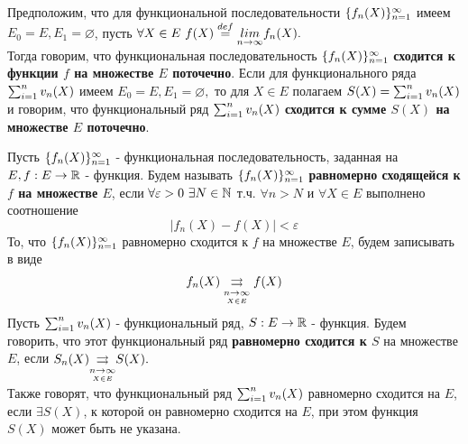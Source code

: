 \documentclass[main]{subfiles}
\begin{document}
   \begin{definition}
Предположим, что для функциональной последовательности $\fnn[f_n(X)]$ имеем $E_0=E, E_1=\varnothing$, 
пусть $\forall X\in E\ f(X)\stackrel{def}{=}\Lim f_n(X).$\\ 
Тогда говорим, что функциональная последовательность 
$\fnn[f_n(X)]$ \textbf{сходится к функции $f$ на множестве $E$ поточечно}.
 Если для функционального ряда $\sumn v_n(X)$ имеем $E_0=E, E_1=\varnothing,$ 
 то для $X\in E$ полагаем $S(X)=\sumn v_n(X)$ и говорим, что функциональный ряд
  $\sumn v_n(X)$ \textbf{сходится к сумме $S(X)$ на множестве $E$ поточечно}. \end{definition}
\begin{definition}
Пусть $\fnn[f_n(X)]$ - функциональная последовательность, заданная на $E, f:E\to{\vR}$ - функция. 
Будем называть $\fnn[f_n(X)]$ \textbf{равномерно сходящейся к $f$ на множестве $E$}, 
если $\forall \varepsilon>0 \ \exists N\in\N $ т.ч. $\forall n>N$ и $\forall X\in E$ 
выполнено соотношение \[ |f_n(X)-f(X)|<\varepsilon\tag{1} \]
То, что $\fnn[f_n(X)]$ равномерно сходится к $f$ на множестве $E$, будем записывать в виде 
\[ f_n(X) \darrow{\underset{X\in E}{n\to\infty}}  f(X)  \]
Пусть $\sumn v_n(X)$ - функциональный ряд, $S:E\to{\vR}$ - функция. Будем говорить, 
что этот функциональный ряд \textbf{равномерно сходится к $S$} на множестве $E$,
 если $S_n(X){\darrow{\underset{X\in E}{n\to\infty}}} S(X).$\\
Также говорят, что функциональный ряд $\sumn v_n(X)$ равномерно сходится на $E$,
 если $\exists S(X)$, к которой он равномерно сходится на $E$, при этом функция $S(X)$ может быть не указана.
\end{definition}
\end{document}
